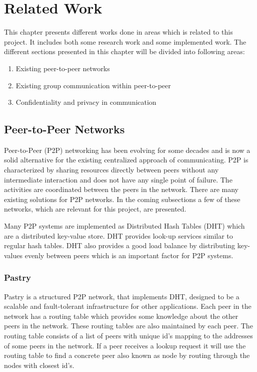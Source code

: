 \chapter{Related Work}
\label{cha:related-work}
This chapter presents different works done in areas which is related to this project. It includes both some research work and some implemented work. 
The different sections presented in this chapter will be divided into following areas:
\begin{enumerate}
	\item Existing peer-to-peer networks
	\item Existing group communication within peer-to-peer  
	\item Confidentiality and privacy in communication
\end{enumerate}

\section{Peer-to-Peer Networks}
\label{sec:p2p-networks}
Peer-to-Peer (P2P) networking has been evolving for some decades and is now a solid alternative for the existing centralized approach of communicating.
P2P is characterized by sharing resources directly between peers without any intermediate interaction and does not have any single point of failure. The activities are coordinated between the peers in the network.
There are many existing solutions for P2P networks. In the coming subsections a few of these networks, which are relevant for this project, are presented. 

Many P2P systems are implemented as Distributed Hash Tables (DHT) which are a distributed key-value store.
DHT provides look-up services similar to regular hash tables.
DHT also provides a good load balance by distributing key-values evenly between peers which is an important factor for P2P systems.

\subsection{Pastry}
Pastry is a structured P2P network, that implements DHT, designed to be a scalable and fault-tolerant infrastructure for other applications. 
Each peer in the network has a routing table which provides some knowledge about the other peers in the network. These routing tables are also maintained by each peer.
The routing table consists of a list of peers with unique id's mapping to the addresses of some peers in the network.
If a peer receives a lookup request it will use the routing table to find a concrete peer also known as node by routing through the nodes with closest id's.

